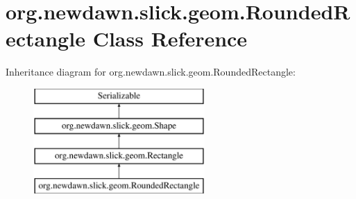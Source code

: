 \hypertarget{classorg_1_1newdawn_1_1slick_1_1geom_1_1_rounded_rectangle}{}\section{org.\+newdawn.\+slick.\+geom.\+Rounded\+Rectangle Class Reference}
\label{classorg_1_1newdawn_1_1slick_1_1geom_1_1_rounded_rectangle}
Inheritance diagram for org.\+newdawn.\+slick.\+geom.\+Rounded\+Rectangle\+:\begin{figure}[H]
\begin{center}
\leavevmode
\includegraphics[height=4.000000cm]{classorg_1_1newdawn_1_1slick_1_1geom_1_1_rounded_rectangle}
\end{center}
\end{figure}
